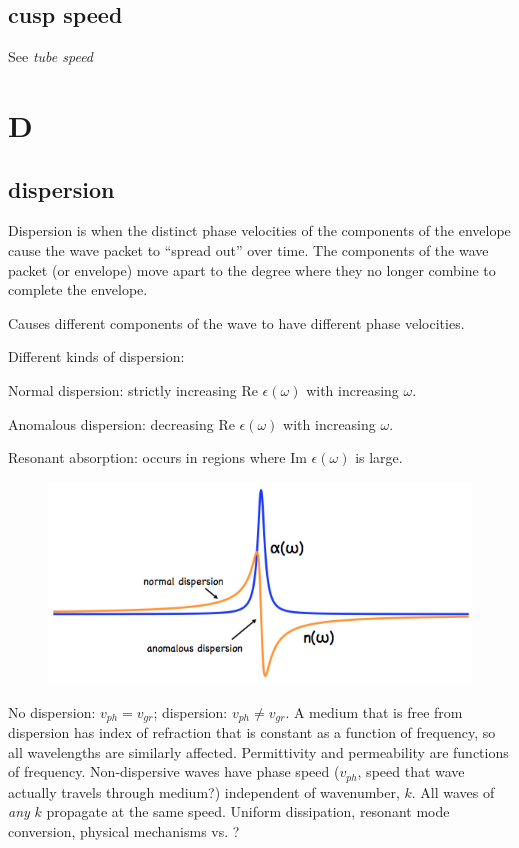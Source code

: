 \documentclass[12pt]{article}
\begin{document}
\subsection*{cusp speed}
See \emph{tube speed}

\section*{D}

\subsection*{dispersion}
Dispersion is when the distinct phase velocities of the components of the
envelope cause the wave packet to ``spread out'' over time.
The components of the wave packet (or envelope) move apart to the degree
where they no longer combine to complete the envelope.

Causes different components of the wave to have different phase velocities.

Different kinds of dispersion:
\begin{itemize*}
    \item Normal dispersion: strictly increasing Re $\epsilon(\omega)$ with
        increasing $\omega$.
    \item Anomalous dispersion: decreasing Re $\epsilon(\omega)$ with
        increasing $\omega$.
    \item Resonant absorption: occurs in regions where Im $\epsilon(\omega)$
        is large.
\end{itemize*}

\begin{figure}[h]
    \centering
    \includegraphics[width=5in]{disp.png}
\end{figure}

No dispersion: $v_{ph} = v_{gr}$; dispersion: $v_{ph} \neq v_{gr}$.
A medium that is free from dispersion has index of refraction that is constant
as a function of frequency, so all wavelengths are similarly affected.
Permittivity and permeability are functions of frequency.
Non-dispersive waves have phase speed ($v_{ph}$, speed that wave actually travels
through medium?) independent of wavenumber, $k$.
All waves of \emph{any} $k$ propagate at the same speed.
Uniform dissipation, resonant mode conversion, physical mechanisms vs. ?
\end{document}

